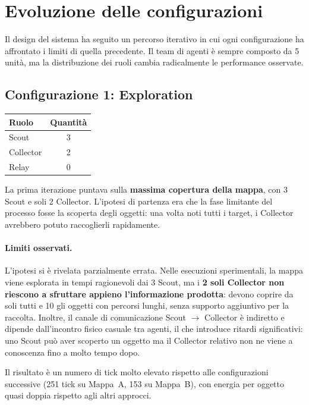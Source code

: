\section{Evoluzione delle configurazioni}
\label{sec:configurazioni}

Il design del sistema ha seguito un percorso iterativo in cui ogni configurazione ha affrontato i limiti di quella precedente. Il team di agenti è sempre composto da 5 unità, ma la distribuzione dei ruoli cambia radicalmente le performance osservate.

\subsection{Configurazione 1: Exploration}

\begin{center}
\begin{tabular}{lc}
\toprule
\textbf{Ruolo} & \textbf{Quantità} \\
\midrule
Scout     & 3 \\
Collector & 2 \\
Relay     & 0 \\
\bottomrule
\end{tabular}
\end{center}

La prima iterazione puntava sulla \textbf{massima copertura della mappa}, con 3 Scout e soli 2 Collector. L'ipotesi di partenza era che la fase limitante del processo fosse la scoperta degli oggetti: una volta noti tutti i target, i Collector avrebbero potuto raccoglierli rapidamente.

\paragraph{Limiti osservati.} L'ipotesi si è rivelata parzialmente errata. Nelle esecuzioni sperimentali, la mappa viene esplorata in tempi ragionevoli dai 3 Scout, ma i \textbf{2 soli Collector non riescono a sfruttare appieno l'informazione prodotta}: devono coprire da soli tutti e 10 gli oggetti con percorsi lunghi, senza supporto aggiuntivo per la raccolta. Inoltre, il canale di comunicazione Scout $\to$ Collector è indiretto e dipende dall'incontro fisico casuale tra agenti, il che introduce ritardi significativi: uno Scout può aver scoperto un oggetto ma il Collector relativo non ne viene a conoscenza fino a molto tempo dopo.

Il risultato è un numero di tick molto elevato rispetto alle configurazioni successive (251 tick su Mappa~A, 153 su Mappa~B), con energia per oggetto quasi doppia rispetto agli altri approcci.

